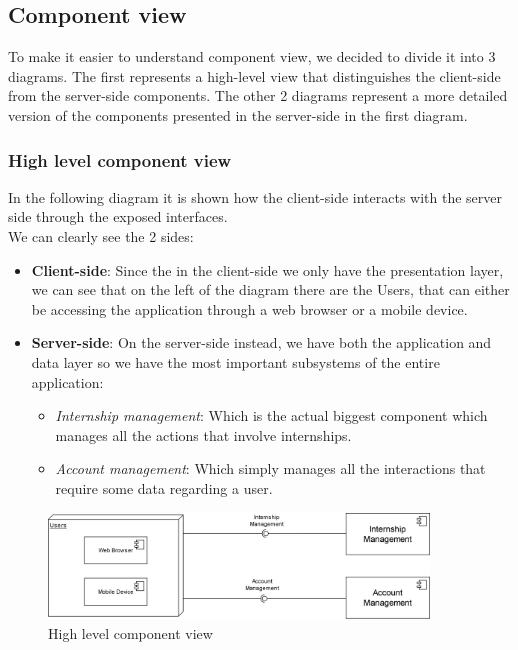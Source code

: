 \documentclass[11pt,twoside]{article}
\begin{document}
	\subsection{Component view}
To make it easier to understand component view, we decided to divide it into 3 diagrams. The first represents a high-level view that distinguishes the client-side from the server-side components. The other 2 diagrams represent a more detailed version of the components presented in the server-side in the first diagram.

		\subsubsection{High level component view}
In the following diagram it is shown how the client-side interacts with the server side through the exposed interfaces.\\
We can clearly see the 2 sides:
\begin{itemize}
\item \textbf{Client-side}: Since the in the client-side we only have the presentation layer, we can see that on the left of the diagram there are the Users, that can either be accessing the application through a web browser or a mobile device.
\item \textbf{Server-side}: On the server-side instead, we have both the application and data layer so we have the most important subsystems of the entire application:
	\begin{itemize}
	\item \textit{Internship management}: Which is the actual biggest component which manages all the actions that involve internships.
	\item \textit{Account management}: Which simply manages all the interactions that require some data regarding a user.
	\end{itemize}
\end{itemize}

\begin{figure}[H]
\centering
\includegraphics[width=0.9\textwidth]{Images/Component}
\caption{High level component view}\label{Component}
\end{figure}
\vspace{\baselineskip}
\end{document}
